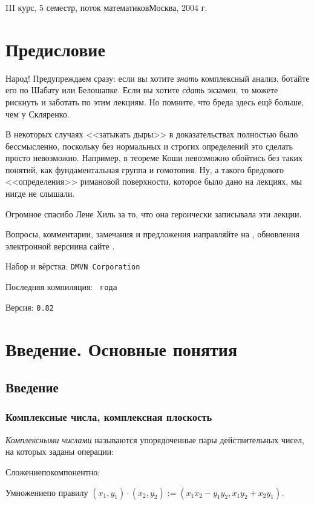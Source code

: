 \documentclass[a4paper]{article}
\begin{document}
{III курс, 5 семестр, поток математиков}{Москва, 2004 г.}
\pagebreak

\tableofcontents

\pagebreak

\section*{Предисловие}

Народ! Предупреждаем сразу: если вы хотите \emph{знать} комплексный анализ,
ботайте его по Шабату или Белошапке. Если вы хотите \emph{сдать} экзамен,
то можете рискнуть и заботать по этим лекциям.
Но помните, что бреда здесь ещё больше, чем у Скляренко.

В некоторых случаях <<затыкать дыры>> в доказательствах полностью было бессмысленно, поскольку без
нормальных и строгих определений это сделать просто невозможно. Например, в теореме Коши
невозможно обойтись без таких понятий, как фундаментальная группа и гомотопия. Ну, а такого
бредового <<определения>> римановой поверхности, которое было дано на лекциях, мы нигде
не слышали.

Огромное спасибо Лене Хиль за то, что она героически записывала эти лекции.

Вопросы, комментарии, замечания и предложения направляйте на \dmvnmail{}, обновления
электронной версии\т на сайте \dmvnwebsite{}.

\hfill Набор и вёрстка: \texttt{DMVN Corporation}

\hfill Последняя компиляция: \texttt{~года}

\hfill Версия: \texttt{0.82}

\pagebreak

\section{Введение. Основные понятия}

\subsection{Введение}

\subsubsection{Комплексные числа, комплексная плоскость}

\begin{df}
\emph{Комплексными числами} называются упорядоченные пары действительных чисел, на которых заданы операции:

\begin{points}{-2}
\item Сложение\т покомпонентно;
\item Умножение\т по правилу $(x_1, y_1)\cdot(x_2, y_2) := (x_1x_2 - y_1 y_2, x_1y_2 + x_2y_1)$.
\end{points}
\end{df}
\end{document}
